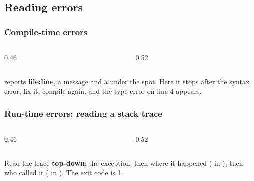 \documentclass[aspectratio=169,10pt,compress]{beamer}
\begin{document}

\subsection[Errors]{Reading errors}




\begin{frame}[t,fragile] \frametitle{Compile-time errors}
  \begin{columns}[T]
    \begin{column}{0.46\textwidth}
    \end{column}
    \begin{column}{0.52\textwidth}
    \end{column}
  \end{columns}

  \vspace{0.1em}
  \small {} reports \textbf{file:line}, a message and a \hCode{\^{}} under the spot. Here it stops after the
  syntax error; fix it, compile again, and the type error on line 4 appears.
\end{frame}




\begin{frame}[t,fragile] \frametitle{Run-time errors: reading a stack trace}
  \begin{columns}[T]
    \begin{column}{0.46\textwidth}
    \end{column}
    \begin{column}{0.52\textwidth}
    \end{column}
  \end{columns}

  \vspace{0.1em}
  \small Read the trace \textbf{top-down}: the exception, then where it happened ( in ),
  then who called it ( in ). The exit code is 1.
\end{frame}
\end{document}
